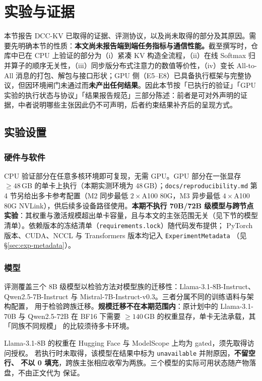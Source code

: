 \section{实验与证据}
\label{sec:experiment}

本节报告 DCC-KV 已取得的证据、评测协议，以及尚未取得的部分及其原因。需要先明确本节的性质：\textbf{本文尚未报告端到端任务指标与通信性能。}截至撰写时，仓库中已在 CPU 上验证的部分为（i）紧凑 KV 构造全流程，（ii）在线 Softmax 归并算子的顺序无关性，（iii）同步版分布式注意力的数值等价性，（iv）变长 All-to-All 消息的打包、解包与接口形状；GPU 侧（E5--E8）已具备执行框架与完整协议，但因环境闸门未通过而\textbf{未产出任何结果}。因此本节按「已执行的验证」「GPU 实验的执行状态与协议」「结果报告规范」三部分陈述：前者是可对外声明的证据，中者说明哪些主张因此仍不可声明，后者约束结果补齐后的呈现方式。

\subsection{实验设置}
\label{sec:exp-setup}

\subsubsection{硬件与软件}

CPU 验证部分在任意多核环境即可复现，无需 GPU。GPU 部分在一张显存 $\ge 48$\,GB 的单卡上执行（本期实测环境为 48\,GB）；\texttt{docs/reproducibility.md} 第 4 节另给出多卡参考配置（M2 同步最低 $2\times$A100 80G，M3 异步最低 $4\times$A100 80G NVLink），供后续多设备路径使用。\textbf{本期不执行 70B/72B 级模型与跨节点实验}：其权重与激活规模超出单卡容量，且与本文的主张范围无关（见下节的模型清单）。依赖版本的冻结清单（\texttt{requirements.lock}）随代码发布提供；
PyTorch 版本、CUDA、NCCL 与 Transformers 版本均记入 \texttt{ExperimentMetadata}
（见 \S\ref{sec:exp-metadata}）。

\subsubsection{模型}

评测覆盖三个 8B 级模型以检验方法对模型族的迁移性：Llama-3.1-8B-Instruct、
Qwen2.5-7B-Instruct 与 Mistral-7B-Instruct-v0.3。三者分属不同的训练语料与架构配置，
用于检验跨族迁移。\textbf{规模迁移不在本期范围内}：原计划中的 Llama-3.1-70B 与
Qwen2.5-72B 在 BF16 下需要 $\ge 140$\,GB 的权重显存，单卡无法承载，其「同族不同规模」
的比较须待多卡环境。

Llama-3.1-8B 的权重在 Hugging Face 与 ModelScope 上均为 gated，须先取得访问授权。
若执行时未取得，该模型在结果中标为 \texttt{unavailable} 并附原因，\textbf{不留空行、
不以 0 填充}，跨族主张相应收窄为两族。三个模型的实际可用状态随产物落盘，不由正文代为
保证。

